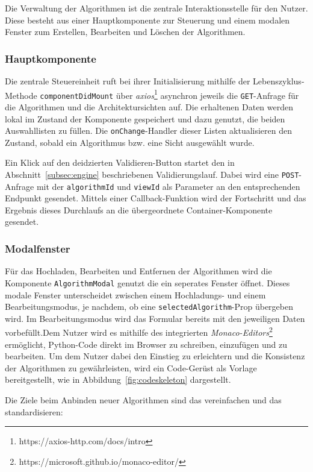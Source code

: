 Die Verwaltung der Algorithmen ist die zentrale Interaktionsstelle für den Nutzer. Diese besteht aus einer Hauptkomponente zur Steuerung und einem modalen Fenster zum Erstellen, Bearbeiten und Löschen der Algorithmen.

\subsubsection*{Hauptkomponente}

Die zentrale Steuereinheit ruft bei ihrer Initialisierung mithilfe der Lebenszyklus-Methode \texttt{componentDidMount} über \textit{axios}\footnote{https://axios-http.com/docs/intro} asynchron jeweils die \texttt{GET}-Anfrage für die Algorithmen und die Architektursichten auf. Die erhaltenen Daten werden lokal im Zustand der Komponente gespeichert und dazu genutzt, die beiden Auswahllisten zu füllen. Die \texttt{onChange}-Handler dieser Listen aktualisieren den Zustand, sobald ein Algorithmus bzw. eine Sicht ausgewählt wurde.

Ein Klick auf den deidzierten \dq Validieren\dq-Button startet den in Abschnitt~\ref{subsec:engine} beschriebenen Validierungslauf. Dabei wird eine \texttt{POST}-Anfrage mit der \texttt{algorithmId} und \texttt{viewId} als Parameter an den entsprechenden Endpunkt gesendet. Mittels einer Callback-Funktion wird der Fortschritt und das Ergebnis dieses Durchlaufs an die übergeordnete Container-Komponente gesendet.

\subsubsection*{Modalfenster}

Für das Hochladen, Bearbeiten und Entfernen der Algorithmen wird die Komponente \texttt{AlgorithmModal} genutzt die ein seperates Fenster öffnet. Dieses modale Fenster unterscheidet zwischen einem Hochladungs- und einem Bearbeitungsmodus, je nachdem, ob eine \texttt{selectedAlgorithm}-Prop übergeben wird. Im Bearbeitungsmodus wird das Formular bereits mit den jeweiligen Daten vorbefüllt.Dem Nutzer wird es mithilfe des integrierten \textit{Monaco-Editors}\footnote{https://microsoft.github.io/monaco-editor/} ermöglicht, Python-Code direkt im Browser zu schreiben, einzufügen und zu bearbeiten. Um dem Nutzer dabei den Einstieg zu erleichtern und die Konsistenz der Algorithmen zu gewährleisten, wird ein Code-Gerüst als Vorlage bereitgestellt, wie in Abbildung~\ref{fig:codeskeleton} dargestellt.

Die Ziele beim Anbinden neuer Algorithmen sind das vereinfachen und das standardisieren:

